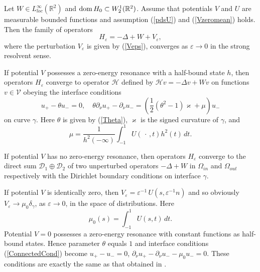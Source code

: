 \documentclass[graybox]{svmult}
\newcommand{\dom}{\mathop{\rm dom}}
\renewcommand{\kappa}{\varkappa}
\newcommand{\Real}{\mathbb R}
\newcommand{\eps}{\varepsilon}
\newcommand{\eqref}[1]{(\ref{#1})}
\begin{document}
\begin{theorem}\label{MainThrm}
Let $W\in L^\infty_{loc}(\Real^2)$ and  $\dom H_0\subset W_2^1(\Real^2)$.
Assume  that potentials $V$ and $U$  are measurable bounded functions and assumption \eqref{pdsU} and \eqref{Vzeromean}  holds.
Then the family of operators
$$
 H_\eps=-\Delta +W+V_\eps,
$$
where the perturbation $V_\eps$ is given by \eqref{Veps},
converges as $\eps\to 0$ in the strong resolvent sense.

If potential $V$ possesses a zero-energy resonance with a half-bound state $h$, then operators $H_\eps$ converge to  operator $\mathcal{H}$
defined by
$
\mathcal{H} v=-\Delta v+Wv
$
on functions $v\in \mathcal{V}$  obeying the interface conditions
\begin{equation}\label{ConnectedCond}
 u_+-\theta u_-=0,\quad  \theta\partial_\nu u_+-\partial_\nu u_-
=\left(\textstyle\frac{1}{2 }(\theta^2-1)\kappa+\mu\right) u_-
\end{equation}
on curve $\gamma$. Here  $\theta$ is given by  \eqref{Theta},  $\kappa$ is the signed curvature of $\gamma$, and
 \begin{equation}\label{Mu}
  \mu=\frac{1}{h^2(-\infty)} \int_{-1}^1 U(\,\cdot\,,t)h^2(t)\, dt.
 \end{equation}


If potential $V$ has no zero-energy resonance, then operators $H_\eps$ converge to the direct sum $\mathcal{D}_1\oplus\mathcal{D}_2$ of two unperturbed operators $-\Delta +W$ in $\Omega_{in}$ and $\Omega_{out}$ respectively with the Dirichlet boundary conditions on interface $\gamma$.
\end{theorem}


\begin{remark}
  If potential $V$ is identically zero, then $V_\eps=\eps^{-1}\,U\left(s,\eps^{-1}n\right)$ and so obviously
$V_\eps\to \mu_0 \delta_\gamma$, as $\eps\to 0$, in the space of distributions. Here
\begin{equation}\label{Mu0}
  \mu_0(s)=\int_{-1}^1U(s,t)\, dt.
\end{equation}
Potential $V=0$ possesses a zero-energy resonance with constant functions as  half-bound states. Hence parameter $\theta$ equals  $1$ and interface conditions \eqref{ConnectedCond} become
$ u_+- u_-=0$,  $\partial_\nu u_+-\partial_\nu u_-
-\mu_0 u_-=0$. These conditions are exactly the same as that obtained in \cite{BEHL2017}.
\end{remark}
\end{document}
